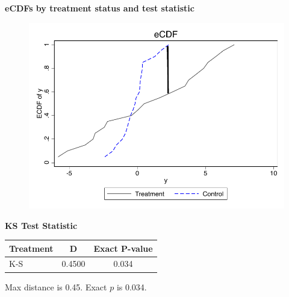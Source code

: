 \documentclass[notes=show]{beamer}
\begin{document}
\begin{frame}[plain]
\begin{center}
\textbf{eCDFs by treatment status and test statistic}
\end{center}

	\begin{figure}
	\includegraphics[scale=0.8]{./lecture_includes/ecdf.pdf}     
	\end{figure}
	
\end{frame}


\begin{frame}[plain]
\begin{center}
\textbf{KS Test Statistic}
\end{center}

\begin{table}[htbp]\centering
\begin{center}
\begin{threeparttable}
\begin{tabular}{lcc}
\toprule
\multicolumn{1}{l}{Treatment}&
\multicolumn{1}{c}{D}&
\multicolumn{1}{c}{Exact P-value}\\
\midrule
K-S &        0.4500 &      0.034 \\
\bottomrule
\end{tabular}
\end{threeparttable}
\end{center}
\end{table}

Max distance is 0.45.  Exact $p$ is 0.034.

\end{frame}
\end{document}
